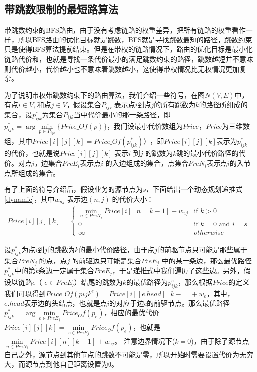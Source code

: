 \subsection{带跳数限制的最短路算法}
带跳数约束的BFS路由，由于没有考虑链路的权重差异，把所有链路的权重看作一样，所以BFS路由的优化目标就是跳数，BFS就是寻找跳数最短的路径，跳数约束只是使得BFS算法提前结束。但是在带权的链路情况下，路由的优化目标是最小化链路代价和，也就是寻找一条代价最小的满足跳数约束的路径，跳数越短并不意味则代价越小，代价越小也不意味着跳数越小，这使得带权情况比无权情况更加复杂。

为了说明带权带跳数约束下的路由算法，我们介绍一些符号，在图$N(V,E)$中，有点$i \in V$, 和点$j \in V$，假设集合$P_{ijk}$ 表示点$i$到点$j$的所有跳数为$k$的路径所组成的集合，设$p_{ijk}^*$为集合$P_{ijk}$当中代价最小的那一条路径，即$p_{ijk}^* =\arg\min\limits_{p \in P_{ijk}}\{Price\_Of(p)\}$，我们设最小代价数组为$Price$，$Price$为三维数组，其中$Price[i][j][k]=Price\_Of(p_{ijk}^*) ）$，即$Price[i][j][k]$表示为$p_{ijk}^*$ 的代价，也就是说$Price[i][j][k]$ 表示$i$ 到$j$ 的跳数为$k$跳的最小代价路径的代价。对点$i$，边集合$PreE_i$表示点$i$ 的入边组成的集合，点集合$PreN_i$表示点$i$的入节点所组成的集合。

有了上面的符号介绍后，假设业务的源节点为$s$，下面给出一个动态规划递推式\ref{dynamic}，其中$w_{nj}$ 表示边$(n,j)$ 的代价大小：
\begin{equation}\label{dynamic}
\begin{split}
Price[i][j][k]
=\begin{cases}
\min\limits_{n \in PreN_i}{Price[i][n][k-1]+w_{nj}} & \text{if $k>0$}\\
0 & \text{if $k=0$ and $i=s $} \\
\infty &{otherwise}
\end{cases}
\end{split}
\end{equation}

设$p_{ijk}^*$为点$i$到$j$的跳数为$k$的最小代价路径，由于点$j$的前驱节点只可能是那些属于集合$PreN_j$ 的点，点$j$ 的前驱边只可能是集合$PreE_j$ 中的某一条边，那么最优路径$p_{ijk}^*$中的第$k$条边一定属于集合$PreE_j$，于是递推式中我们遍历了这些边。另外，假设以链路$e$（ $e \in PreE_j$）结尾的跳数为$k$的最优路径为$p_{ijk}^e$，那么根据$Price$的定义我们可以得到$Price\_Of(p{ijk}^e)=Price[i][e.head][k-1]+w_e$，其中，$e.head$表示边的头结点，也就是点$i$的对应于边$e$的前驱节点。那么最优路径$p_{ijk}^*=\arg\min\limits_{e \in PreE_j}{Price_Of(p_e)}$，相应的最优代价$Price[i][j][k]=\min\limits_{e \in PreE_j}{Price_Of(p_e)}$，也就是$\min\limits_{n \in PreN_i}{Price[i][n][k-1]+w_{nj}}$。 注意边界情况下($k=0$)，由于除了源节点自己之外，源节点到其他节点的跳数不可能是零，所以开始时需要设置代价为无穷大，而源节点到他自己距离设置为0。

